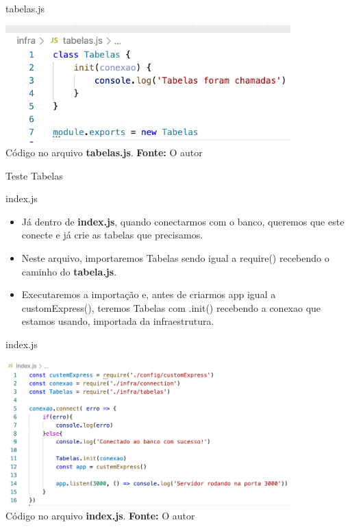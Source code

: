\documentclass{beamer}
\begin{document}
    \begin{frame}[label=lists]{tabelas.js}
	\begin{center}
    		\includegraphics[width=110mm]{resources/aula6_5.png}\\
	        \tiny{ Código no arquivo \textbf{tabelas.js}. \textbf{Fonte:} O autor}
	 \end{center}
    \end{frame}
    \begin{frame}[label=proof]{Teste Tabelas}
    \begin{alertblock}{index.js}
	\begin{itemize}
	\item Já dentro de \textbf{index.js}, quando conectarmos com o banco, queremos que este conecte e já crie as tabelas que precisamos.
	\item Neste arquivo, importaremos Tabelas sendo igual a \alert{require()} recebendo o caminho do \textbf{tabela.js}.
	\item Executaremos a importação e, antes de criarmos app igual a \alert{customExpress()}, teremos Tabelas com \alert{.init()} recebendo a \alert{conexao} que estamos usando, importada da infraestrutura.
	\end{itemize}
	\end{alertblock}
    \end{frame}
    \begin{frame}{index.js}
         \begin{center}
    	\includegraphics[width=110mm]{resources/aula6_6.png}\\
        \tiny{ Código no arquivo \textbf{index.js}. \textbf{Fonte:} O autor}
     \end{center}   
    \end{frame}
\end{document}
